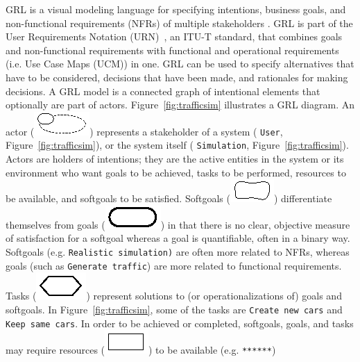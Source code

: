 GRL is a visual modeling language for specifying intentions, business goals, and non-functional requirements (NFRs) of multiple stakeholders \cite{Amyot:2010:EGM:1841349.1841356}. GRL is part of the User Requirements Notation (URN)~\cite{}, an ITU-T standard, that combines goals and non-functional requirements with functional and operational requirements (i.e. Use Case Maps (UCM)) in one.  GRL can be used to specify alternatives that have to be considered, decisions that have been made, and rationales for making decisions. A GRL model is a connected graph of intentional elements that optionally are part of actors. Figure~\ref{fig:trafficsim} illustrates a GRL diagram. An actor (\includegraphics[scale=1]{img/actor}) represents a stakeholder of a system ( \texttt{User}, Figure~\ref{fig:trafficsim}), or the system itself ( \texttt{Simulation}, Figure~\ref{fig:trafficsim}). Actors are holders of intentions; they are the active entities in the system or its environment who want goals to be achieved, tasks to be performed, resources to be available, and softgoals to be satisfied. Softgoals (\includegraphics[scale=1]{img/softgoal}) differentiate themselves from goals (\includegraphics[scale=1]{img/goal}) in that there is no clear, objective measure of satisfaction for a softgoal whereas a goal is quantifiable, often in a binary way. Softgoals (e.g.  \texttt{Realistic simulation)} are often more related to NFRs, whereas goals (such as  \texttt{Generate traffic}) are more related to functional requirements. Tasks (\includegraphics[scale=1]{img/task}) represent solutions to (or operationalizations of) goals and softgoals. In Figure~\ref{fig:trafficsim}, some of the tasks are  \texttt{Create new cars} and \texttt{Keep same cars}. In order to be achieved or completed, softgoals, goals, and tasks may require resources (\includegraphics[scale=1]{img/resource}) to be available (e.g.  \texttt{******}) %

